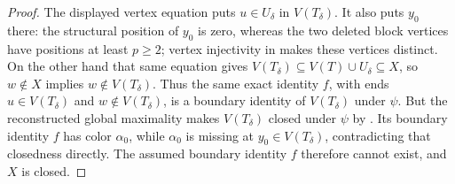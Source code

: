 \begin{proof}
The displayed vertex equation puts $u\in U_\delta$ in $V(T_\delta)$.
It also puts $y_0$ there: the structural position of $y_0$ is zero,
whereas the two deleted block vertices have positions at least $p\geq2$;
vertex injectivity in  makes these vertices
distinct.  On the other hand that same equation gives
$V(T_\delta)\subseteq V(T)\cup U_\delta\subseteq X$, so
$w\notin X$ implies $w\notin V(T_\delta)$.  Thus the same exact identity
$f$, with ends $u\in V(T_\delta)$ and $w\notin V(T_\delta)$, is a boundary
identity of $V(T_\delta)$ under $\psi$.  But the reconstructed global
maximality makes $V(T_\delta)$ closed under $\psi$ by
.  Its boundary identity $f$ has color
$\alpha_0$, while $\alpha_0$ is missing at
$y_0\in V(T_\delta)$, contradicting that closedness directly.  The assumed
boundary identity $f$ therefore cannot exist, and $X$ is closed.
\end{proof}
